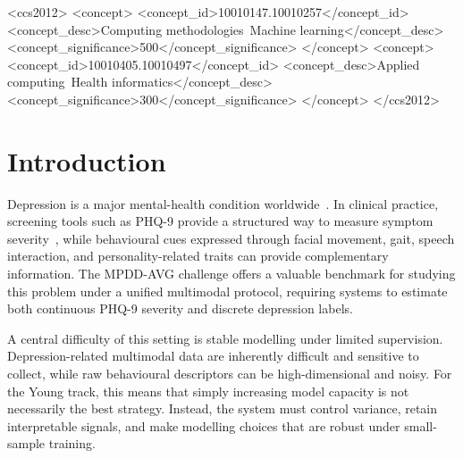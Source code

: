 \documentclass[sigconf,screen,review]{acmart}
\begin{document}
\begin{CCSXML}
<ccs2012>
<concept>
<concept_id>10010147.10010257</concept_id>
<concept_desc>Computing methodologies~Machine learning</concept_desc>
<concept_significance>500</concept_significance>
</concept>
<concept>
<concept_id>10010405.10010497</concept_id>
<concept_desc>Applied computing~Health informatics</concept_desc>
<concept_significance>300</concept_significance>
</concept>
</ccs2012>
\end{CCSXML}



\maketitle


\section{Introduction}

Depression is a major mental-health condition worldwide~\cite{who2017depression}. In clinical practice, screening tools such as PHQ-9 provide a structured way to measure symptom severity~\cite{kroenke2001phq}, while behavioural cues expressed through facial movement, gait, speech interaction, and personality-related traits can provide complementary information. The MPDD-AVG challenge offers a valuable benchmark for studying this problem under a unified multimodal protocol, requiring systems to estimate both continuous PHQ-9 severity and discrete depression labels.

A central difficulty of this setting is stable modelling under limited supervision. Depression-related multimodal data are inherently difficult and sensitive to collect, while raw behavioural descriptors can be high-dimensional and noisy. For the Young track, this means that simply increasing model capacity is not necessarily the best strategy. Instead, the system must control variance, retain interpretable signals, and make modelling choices that are robust under small-sample training.
\end{document}
